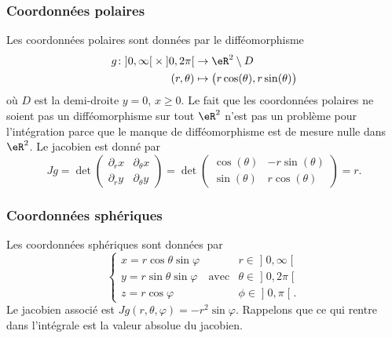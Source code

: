 					\subsubsection{Coordonnées polaires}

Les coordonnées polaires sont données par le difféomorphisme
\begin{equation}
	\begin{aligned}
		g\colon \mathopen]0,\infty\mathclose[\times\mathopen]0,2\pi\mathclose[ &\to\eR^2\setminus D\\
		(r,\theta)&\mapsto \big( r\cos(\theta),r\sin(\theta) \big)
	\end{aligned}
\end{equation}
où $D$ est la demi-droite $y=0$, $x\geq 0$. Le fait que les coordonnées polaires ne soient pas un difféomorphisme sur tout $\eR^2$ n'est pas un problème pour l'intégration parce que le manque de difféomorphisme est de mesure nulle dans $\eR^2$. Le jacobien est donné par
\begin{equation}
	Jg=\det\begin{pmatrix}
	\partial_rx	&	\partial_{\theta}x	\\
	\partial_ry	&	\partial_{\theta}y
\end{pmatrix}=\det\begin{pmatrix}
	\cos(\theta)	&	-r\sin(\theta)	\\
	\sin(\theta)	&	r\cos(\theta)
\end{pmatrix}=r.
\end{equation}

					\subsubsection{Coordonnées sphériques}
\label{SubSubCoordSpJxhMwm}

Les coordonnées sphériques sont données par
\begin{equation}		\label{OMEqChmVarSpherique}
	\left\{
\begin{array}{lllll}
x=r\cos\theta\sin\varphi	&			&r\in\mathopen] 0 , \infty \mathclose[\\
y=r\sin\theta\sin\varphi	&	\text{avec}	&\theta\in\mathopen] 0 , 2\pi \mathclose[\\
z=r\cos\varphi			&			&\phi\in\mathopen] 0 , \pi \mathclose[.
\end{array}
\right.
\end{equation}
Le jacobien associé est $Jg(r,\theta,\varphi)=-r^2\sin\varphi$. Rappelons que ce qui rentre dans l'intégrale est la valeur absolue du jacobien.

